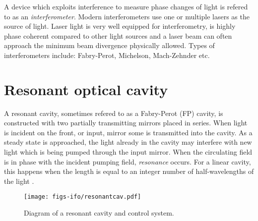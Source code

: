 A device which exploits interference to measure phase changes of light is refered to as an \emph{interferometer}. %
Modern interferometers use one or multiple lasers as the source of light. %
Laser light is very well equipped for interferometry, is highly phase coherent compared to other light sources and a laser beam can often approach the minimum beam divergence physically allowed. %
Types of interferometers include: Fabry-Perot, Michelson, Mach-Zehnder etc.

\section{Resonant optical cavity}
A resonant cavity, sometimes refered to as a Fabry-Perot (FP) cavity, is constructed with two partially transmitting mirrors placed in series. %
When light is incident on the front, or input, mirror some is transmitted into the cavity. %
As a steady state is approached, the light already in the cavity may interfere with new light which is being pumped through the input mirror. %
When the circulating field is in phase with the incident pumping field, \emph{resonance} occurs. %
For a linear cavity, this happens when the length is equal to an integer number of half-wavelengths of the light \cite{Siegman}.

\begin{figure}
  \begin{center}
  \leavevmode
  \texttt{[image: figs-ifo/resonantcav.pdf]}
  \end{center}
  \caption[Diagram of a resonant cavity and control system]{Diagram of a resonant cavity and control system. }
  \label{fig:resonantcav}
\end{figure}

